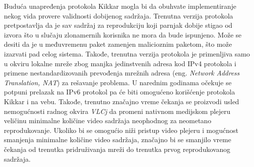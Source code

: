\documentclass[12pt,oneside]{memoir}
\begin{document}
Buduća unapređenja protokola Kikkar mogla bi da obuhvate implementiranje nekog vida provere validnosti dobijenog sadržaja. Trenutna verzija protokola pretpostavlja da je sav sadržaj za reprodukciju koji parnjak dobije stigao od izvora što u slučaju zlonamernih korisnika ne mora da bude ispunjeno. Može se desiti da je u međuvremenu paket zamenjen malicioznim paketom, što može izazvati pad celog sistema. Takođe, trenutna verzija protokola je primenljiva samo u okviru lokalne mreže zbog manjka jedinstvenih adresa kod IPv4 protokola i primene nestandardizovanih prevođenja mrežnih adresa (eng. \textit{Network Address Translation, NAT}) za rešavanje problema. U narednim godinama očekuje se potpuni prelazak na IPv6 protokol pa će biti omogućeno korišćenje protokola Kikkar i na vebu. Takođe, trenutno značajno vreme čekanja se proizvodi usled nemogućnosti radnog okvira \textit{VLCj} da promeni nativnom medijskom plejeru veličinu minimalne količine video sadržaja neophodnog za neometano reprodukovanje. Ukoliko bi se omogućio niži pristup video plejeru i mogućnost smanjenja minimalne količine video sadržaja, značajno bi se smanjilo vreme čekanja od trenutka pridruživanja mreži do trenutka prvog reprodukovanog sadržaja.
 



\literatura

\backmatter

\end{document}
